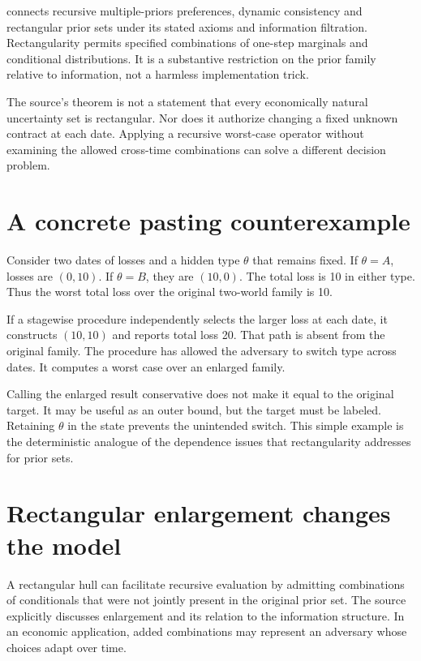 \citet[Definition 3.1 and Theorem 3.2]{epstein2002preprint} connects recursive multiple-priors preferences, dynamic consistency and rectangular prior sets under its stated axioms and information filtration. Rectangularity permits specified combinations of one-step marginals and conditional distributions. It is a substantive restriction on the prior family relative to information, not a harmless implementation trick.

The source's theorem is not a statement that every economically natural uncertainty set is rectangular. Nor does it authorize changing a fixed unknown contract at each date. Applying a recursive worst-case operator without examining the allowed cross-time combinations can solve a different decision problem.

\section{A concrete pasting counterexample}
Consider two dates of losses and a hidden type $\theta$ that remains fixed. If $\theta=A$, losses are $(0,10)$. If $\theta=B$, they are $(10,0)$. The total loss is 10 in either type. Thus the worst total loss over the original two-world family is 10.

If a stagewise procedure independently selects the larger loss at each date, it constructs $(10,10)$ and reports total loss 20. That path is absent from the original family. The procedure has allowed the adversary to switch type across dates. It computes a worst case over an enlarged family.

Calling the enlarged result conservative does not make it equal to the original target. It may be useful as an outer bound, but the target must be labeled. Retaining $\theta$ in the state prevents the unintended switch. This simple example is the deterministic analogue of the dependence issues that rectangularity addresses for prior sets.

\section{Rectangular enlargement changes the model}
A rectangular hull can facilitate recursive evaluation by admitting combinations of conditionals that were not jointly present in the original prior set. The source explicitly discusses enlargement and its relation to the information structure. In an economic application, added combinations may represent an adversary whose choices adapt over time.

